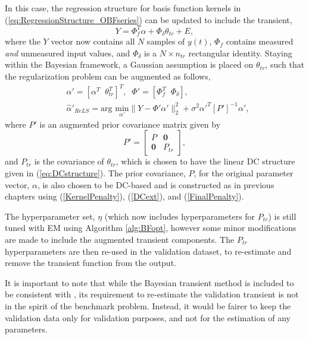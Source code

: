 In this case, the regression structure for basis function kernels in (\ref{eq:RegressionStructure_OBFseries}) can be updated to include the transient,
\begin{equation}
Y = \Phi_f^T \alpha + \Phi_{\delta} \theta_{tr} + E,
\end{equation}
where the $Y$ vector now contains all $N$ samples of $y(t)$, $\Phi_f$ contains measured \emph{and} unmeasured input values, and $\Phi_{\delta}$ is a $N \times n_{tr}$ rectangular identity. Staying within the Bayesian framework, a Gaussian assumption is placed on $\theta_{tr}$, such that the regularization problem can be augmented as follows,
\begin{align}
&\alpha' = [\alpha^T \; \; \theta_{tr}^T]^T, \; \; \Phi' = [\Phi_f^T \; \; \Phi_{\delta}], \nonumber \\
&\hat{\alpha}'_{ReLS} = \text{arg } \underset{\alpha'}{\text{min}} \|Y - \Phi' \alpha' \|^2_2 + \sigma^2 \alpha'^T [P']^{-1} \alpha',
\end{align}
where $P'$ is an augmented prior covariance matrix given by
$$P' = \begin{bmatrix}
       P &  \mathbf{0} \\
        \mathbf{0}  & P_{tr}
     \end{bmatrix},$$
and $P_{tr}$ is the covariance of $\theta_{tr}$, which is chosen to have the linear DC structure given in (\ref{eq:DCstructure}). The prior covariance, $P$, for the original parameter vector, $\alpha$, is also chosen to be DC-based and is constructed as in previous chapters using (\ref{KernelPenalty}), (\ref{DCext}), and (\ref{FinalPenalty}).

The hyperparameter set, $\eta$ (which now includes hyperparameters for $P_{tr}$) is still tuned with EM using Algorithm \ref{alg:BFopt}, however some minor modifications are made to include the augmented transient components. The $P_{tr}$ hyperparameters are then re-used in the validation dataset, to re-estimate and remove the transient function from the output.

\begin{rem}
\label{rem:BayesTrans}
It is important to note that while the Bayesian transient method is included to be consistent with \cite{Birpoutsoukis2017b}, its requirement to re-estimate the validation transient is not in the spirit of the benchmark problem. Instead, it would be fairer to keep the validation data only for validation purposes, and not for the estimation of any parameters.
\end{rem}

